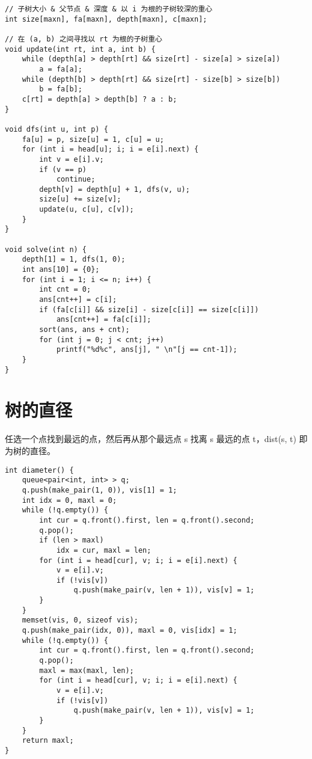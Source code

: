 \begin{verbatim}
// 子树大小 & 父节点 & 深度 & 以 i 为根的子树较深的重心
int size[maxn], fa[maxn], depth[maxn], c[maxn];

// 在 (a, b) 之间寻找以 rt 为根的子树重心
void update(int rt, int a, int b) {
    while (depth[a] > depth[rt] && size[rt] - size[a] > size[a])
        a = fa[a];
    while (depth[b] > depth[rt] && size[rt] - size[b] > size[b])
        b = fa[b];
    c[rt] = depth[a] > depth[b] ? a : b;
}

void dfs(int u, int p) {
    fa[u] = p, size[u] = 1, c[u] = u;
    for (int i = head[u]; i; i = e[i].next) {
        int v = e[i].v;
        if (v == p)
            continue;
        depth[v] = depth[u] + 1, dfs(v, u);
        size[u] += size[v];
        update(u, c[u], c[v]);
    }
}

void solve(int n) {
    depth[1] = 1, dfs(1, 0);
    int ans[10] = {0};
    for (int i = 1; i <= n; i++) {
        int cnt = 0;
        ans[cnt++] = c[i];
        if (fa[c[i]] && size[i] - size[c[i]] == size[c[i]])
            ans[cnt++] = fa[c[i]];
        sort(ans, ans + cnt);
        for (int j = 0; j < cnt; j++)
            printf("%d%c", ans[j], " \n"[j == cnt-1]);
    }
}
\end{verbatim}

\section{树的直径}
任选一个点找到最远的点，然后再从那个最远点 s 找离 s 最远的点 t，dist(s, t) 即为树的直径。
\begin{verbatim}
int diameter() {
    queue<pair<int, int> > q;
    q.push(make_pair(1, 0)), vis[1] = 1;
    int idx = 0, maxl = 0;
    while (!q.empty()) {
        int cur = q.front().first, len = q.front().second;
        q.pop();
        if (len > maxl)
            idx = cur, maxl = len;
        for (int i = head[cur], v; i; i = e[i].next) {
            v = e[i].v;
            if (!vis[v])
                q.push(make_pair(v, len + 1)), vis[v] = 1;
        }
    }
    memset(vis, 0, sizeof vis);
    q.push(make_pair(idx, 0)), maxl = 0, vis[idx] = 1;
    while (!q.empty()) {
        int cur = q.front().first, len = q.front().second;
        q.pop();
        maxl = max(maxl, len);
        for (int i = head[cur], v; i; i = e[i].next) {
            v = e[i].v;
            if (!vis[v])
                q.push(make_pair(v, len + 1)), vis[v] = 1;
        }
    }
    return maxl;
}
\end{verbatim}